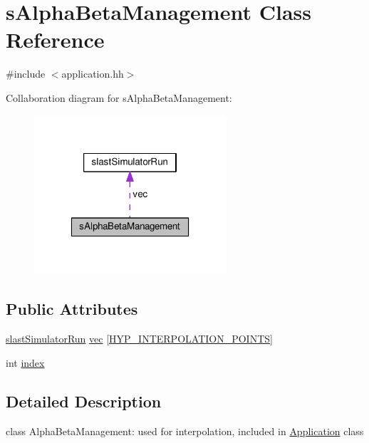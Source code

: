 \hypertarget{classsAlphaBetaManagement}{\section{s\-Alpha\-Beta\-Management Class Reference}
\label{classsAlphaBetaManagement}
}


{\ttfamily \#include $<$application.\-hh$>$}



Collaboration diagram for s\-Alpha\-Beta\-Management\-:\nopagebreak
\begin{figure}[H]
\begin{center}
\leavevmode
\includegraphics[width=202pt]{classsAlphaBetaManagement__coll__graph}
\end{center}
\end{figure}
\subsection*{Public Attributes}
\begin{DoxyCompactItemize}
\item 
\hyperlink{classslastSimulatorRun}{slast\-Simulator\-Run} \hyperlink{classsAlphaBetaManagement_af9fd5945bd8e0566f69804372b5ca01d}{vec} \mbox{[}\hyperlink{application_8hh_a0f42c303bf81baaf28a6fa46e2b3e58e}{H\-Y\-P\-\_\-\-I\-N\-T\-E\-R\-P\-O\-L\-A\-T\-I\-O\-N\-\_\-\-P\-O\-I\-N\-T\-S}\mbox{]}
\item 
int \hyperlink{classsAlphaBetaManagement_acfd2318c63ee03cd1e25904deedfe88f}{index}
\end{DoxyCompactItemize}


\subsection{Detailed Description}
class Alpha\-Beta\-Management\-: used for interpolation, included in \hyperlink{classApplication}{Application} class 

